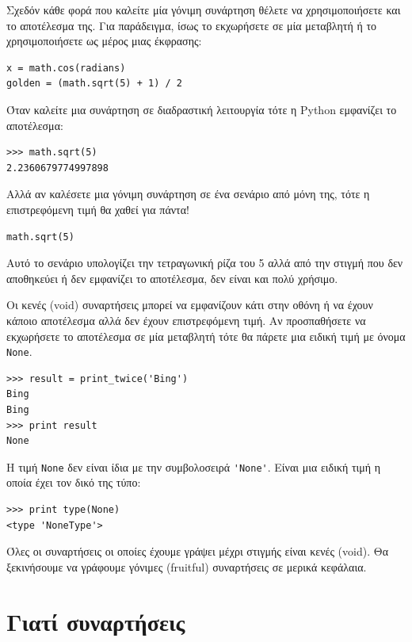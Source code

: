 \documentclass[10pt]{book}
\begin{document}
Σχεδόν κάθε φορά που καλείτε μία γόνιμη συνάρτηση θέλετε να χρησιμοποιήσετε
και το αποτέλεσμα της. Για παράδειγμα, ίσως το εκχωρήσετε σε μία μεταβλητή ή το 
χρησιμοποιήσετε ως μέρος μιας έκφρασης: 


\begin{verbatim}
x = math.cos(radians)
golden = (math.sqrt(5) + 1) / 2
\end{verbatim}
%

Όταν καλείτε μια συνάρτηση σε διαδραστική λειτουργία τότε η Python 
εμφανίζει το αποτέλεσμα:


\begin{verbatim}
>>> math.sqrt(5)
2.2360679774997898
\end{verbatim}
%

Αλλά αν καλέσετε μια γόνιμη συνάρτηση σε ένα σενάριο από μόνη της, τότε
η επιστρεφόμενη τιμή θα χαθεί για πάντα!


\begin{verbatim}
math.sqrt(5)
\end{verbatim}
%

Αυτό το σενάριο υπολογίζει την τετραγωνική ρίζα του 5 αλλά από την στιγμή που
δεν αποθηκεύει ή δεν εμφανίζει το αποτέλεσμα, δεν είναι και πολύ χρήσιμο.

Οι κενές (void) συναρτήσεις μπορεί να εμφανίζουν κάτι στην οθόνη ή να έχουν κάποιο αποτέλεσμα αλλά δεν έχουν επιστρεφόμενη τιμή. Αν προσπαθήσετε να εκχωρήσετε το αποτέλεσμα σε μία μεταβλητή τότε θα πάρετε μια ειδική τιμή με όνομα {\tt None}.

\begin{verbatim}
>>> result = print_twice('Bing')
Bing
Bing
>>> print result
None
\end{verbatim}
%

Η τιμή {\tt None} δεν είναι ίδια με την συμβολοσειρά \verb"'None'".
Είναι μια ειδική τιμή η οποία έχει τον δικό της τύπο:


\begin{verbatim}
>>> print type(None)
<type 'NoneType'>
\end{verbatim}
%

Όλες οι συναρτήσεις οι οποίες έχουμε γράψει μέχρι στιγμής είναι κενές (void). 
Θα ξεκινήσουμε να γράφουμε γόνιμες (fruitful) συναρτήσεις σε μερικά κεφάλαια.


\section{Γιατί συναρτήσεις}
\end{document}
